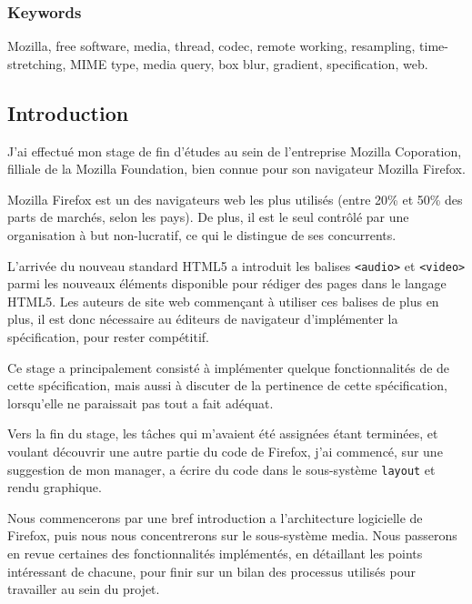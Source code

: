 \documentclass[a4paper,10pt]{article}
\newcommand{\cc}[1]{\texttt{#1}}
\begin{document}
\section*{Keywords}
Mozilla, free software, media, thread, codec, remote working, resampling,
time-stretching, MIME type, media query, box blur, gradient, specification, web.

{\footnotesize
\tableofcontents
}

\clearpage

\begin{multicols}{2}
  \part*{Introduction}
  J'ai effectué mon stage de fin d'études au sein de l'entreprise Mozilla
  Coporation, filliale de la Mozilla Foundation, bien connue pour son navigateur
  Mozilla Firefox.

  Mozilla Firefox est un des navigateurs web les plus utilisés (entre 20\% et 50\%
  des parts de marchés, selon les pays). De plus, il est le seul contrôlé par
  une organisation à but non-lucratif, ce qui le distingue de ses concurrents.

  L'arrivée du nouveau standard HTML5\cite{HTML} a introduit les balises \cc{<audio>}
  et \cc{<video>} parmi les nouveaux éléments disponible pour rédiger des pages
  dans le langage HTML5. Les auteurs de site web commençant à utiliser
  ces balises de plus en plus, il est donc nécessaire au éditeurs de navigateur
  d'implémenter la spécification, pour rester compétitif.

  Ce stage a principalement consisté à implémenter quelque fonctionnalités de
  de cette spécification, mais aussi à discuter de la pertinence de cette
  spécification, lorsqu'elle ne paraissait pas tout a fait adéquat.

  Vers la fin du stage, les tâches qui m'avaient été assignées étant terminées,
  et voulant découvrir une autre partie du code de Firefox, j'ai commencé, sur
  une suggestion de mon manager, a écrire du code dans le sous-système
  \cc{layout} et rendu graphique.

  Nous commencerons par une bref introduction a l'architecture logicielle de
  Firefox, puis nous nous concentrerons sur le sous-système media. Nous
  passerons en revue certaines des fonctionnalités implémentés, en détaillant
  les points intéressant de chacune, pour finir sur un bilan des processus
  utilisés pour travailler au sein du projet.


\end{multicols}
\end{document}
